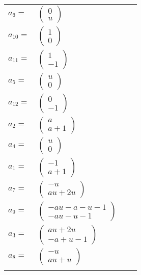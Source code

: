\documentclass[1p]{elsarticle_modified}
\theoremstyle{definition}
\begin{document}
\begin{tabular}{m{7pt} m{180pt} m{7pt} m{180pt} }
\flushright $a_{6}=$&$\begin{pmatrix}0\\u\end{pmatrix}$ \\
\flushright $a_{10}=$&$\begin{pmatrix}1\\0\end{pmatrix}$ \\
\flushright $a_{11}=$&$\begin{pmatrix}1\\-1\end{pmatrix}$ \\
\flushright $a_{5}=$&$\begin{pmatrix}u\\0\end{pmatrix}$ \\
\flushright $a_{12}=$&$\begin{pmatrix}0\\-1\end{pmatrix}$ \\
\flushright $a_{2}=$&$\begin{pmatrix}a\\a+1\end{pmatrix}$ \\
\flushright $a_{4}=$&$\begin{pmatrix}u\\0\end{pmatrix}$ \\
\flushright $a_{1}=$&$\begin{pmatrix}-1\\a+1\end{pmatrix}$ \\
\flushright $a_{7}=$&$\begin{pmatrix}- u\\a u+2 u\end{pmatrix}$ \\
\flushright $a_{9}=$&$\begin{pmatrix}- a u- a- u-1\\- a u- u-1\end{pmatrix}$ \\
\flushright $a_{3}=$&$\begin{pmatrix}a u+2 u\\- a+u-1\end{pmatrix}$ \\
\flushright $a_{8}=$&$\begin{pmatrix}- u\\a u+u\end{pmatrix}$\\&\end{tabular}
\end{document}

